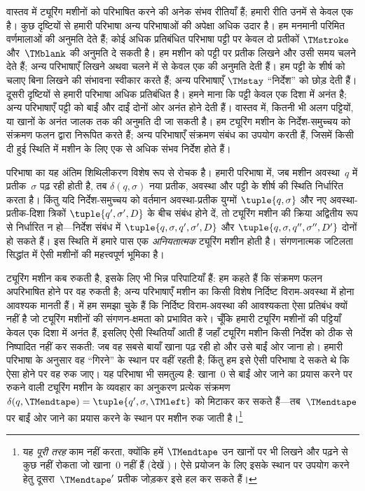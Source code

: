 \documentclass[../../../include/open-logic-section]{subfiles}
\begin{document}

वास्तव में ट्यूरिंग मशीनों को परिभाषित करने की अनेक संभव रीतियाँ हैं;
हमारी रीति उनमें से केवल एक है। कुछ दृष्टियों से हमारी परिभाषा अन्य
परिभाषाओं की अपेक्षा अधिक उदार है। हम मनमानी परिमित वर्णमालाओं की अनुमति
देते हैं; कोई अधिक प्रतिबंधित परिभाषा पट्टी पर केवल दो प्रतीकों
$\TMstroke$ और~$\TMblank$ की अनुमति दे सकती है। हम मशीन को पट्टी पर
प्रतीक लिखने और उसी समय चलने देते हैं; अन्य परिभाषाएँ लिखने अथवा चलने में
से केवल एक की अनुमति देती हैं। हम पट्टी के शीर्ष को चलाए बिना लिखने की
संभावना स्वीकार करते हैं; अन्य परिभाषाएँ $\TMstay$ ``निर्देश'' को छोड़
देती हैं। दूसरी दृष्टियों से हमारी परिभाषा अधिक प्रतिबंधित है। हमने माना
कि पट्टी केवल एक दिशा में अनंत है; अन्य परिभाषाएँ पट्टी को बाईं और दाईं
दोनों ओर अनंत होने देती हैं। वास्तव में, कितनी भी अलग पट्टियों, या खानों
के अनंत जालक तक की अनुमति दी जा सकती है। हम ट्यूरिंग मशीन के
निर्देश-समुच्चय को संक्रमण फलन द्वारा निरूपित करते हैं; अन्य परिभाषाएँ
संक्रमण संबंध का उपयोग करती हैं, जिसमें किसी दी हुई स्थिति में मशीन के
लिए एक से अधिक संभव निर्देश होते हैं।

परिभाषा का यह अंतिम शिथिलीकरण विशेष रूप से रोचक है। हमारी परिभाषा में,
जब मशीन अवस्था~$q$ में प्रतीक~$\sigma$ पढ़ रही होती है, तब
$\delta(q, \sigma)$ नया प्रतीक, अवस्था और पट्टी के शीर्ष की स्थिति
निर्धारित करता है। किंतु यदि निर्देश-समुच्चय को वर्तमान अवस्था-प्रतीक
युग्मों $\tuple{q,
  \sigma}$ और नए अवस्था-प्रतीक-दिशा त्रिकों $\tuple{q', \sigma',
  D}$ के बीच संबंध होने दें, तो ट्यूरिंग मशीन की
क्रिया अद्वितीय रूप से निर्धारित न हो---निर्देश संबंध में
$\tuple{q,
  \sigma, q', \sigma', D}$ और
$\tuple{q, \sigma, q'', \sigma'', D'}$ दोनों हो सकते हैं। इस स्थिति में
हमारे पास एक \emph{अनियतात्मक} ट्यूरिंग मशीन होती है। संगणनात्मक जटिलता
सिद्धांत में ऐसी मशीनों की महत्त्वपूर्ण भूमिका है।

ट्यूरिंग मशीन कब रुकती है, इसके लिए भी भिन्न परिपाटियाँ हैं: हम कहते
हैं कि संक्रमण फलन अपरिभाषित होने पर वह रुकती है; अन्य परिभाषाएँ मशीन
का किसी विशेष निर्दिष्ट विराम-अवस्था में होना आवश्यक मानती हैं।
 में हम समझा चुके हैं कि निर्दिष्ट विराम-अवस्था की
आवश्यकता ऐसा प्रतिबंध क्यों नहीं है जो ट्यूरिंग मशीनों की संगणन-क्षमता
को प्रभावित करे। चूँकि हमारी ट्यूरिंग मशीनों की पट्टियाँ केवल एक दिशा
में अनंत हैं, इसलिए ऐसी स्थितियाँ आती हैं जहाँ ट्यूरिंग मशीन किसी
निर्देश को ठीक से निष्पादित नहीं कर सकती: जब वह सबसे बायाँ खाना पढ़ रही
हो और उसे बाईं ओर जाना हो। हमारी परिभाषा के अनुसार वह ``गिरने'' के
स्थान पर वहीं रहती है; किंतु हम इसे ऐसी परिभाषा दे सकते थे कि ऐसा होने
पर वह रुक जाए। यह परिभाषा भी समतुल्य है: खाना~$0$ से बाईं ओर जाने का
प्रयास करने पर रुकने वाली ट्यूरिंग मशीन के व्यवहार का अनुकरण प्रत्येक
संक्रमण $\delta(q,\TMendtape) =
\tuple{q',\sigma,\TMleft}$ को मिटाकर कर
सकते हैं---तब~$\TMendtape$ पर बाईं ओर जाने का प्रयास करने के स्थान पर
मशीन रुक जाती है।\footnote{यह \emph{पूरी तरह} काम नहीं करता, क्योंकि
हमें $\TMendtape$ उन खानों पर भी लिखने और पढ़ने से कुछ नहीं रोकता जो
खाना~$0$ नहीं हैं (देखें )। ऐसे प्रयोजन के लिए
इसके स्थान पर उपयोग करने हेतु दूसरा~$\TMendtape'$ प्रतीक जोड़कर इसे हल
कर सकते हैं।}
\end{document}
